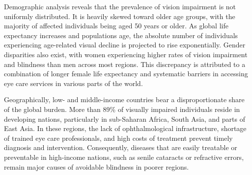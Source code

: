 Demographic analysis reveals that the prevalence of vision impairment is not uniformly distributed. It is heavily skewed toward older age groups, with the majority of affected individuals being aged 50 years or older. As global life expectancy increases and populations age, the absolute number of individuals experiencing age-related visual decline is projected to rise exponentially. Gender disparities also exist, with women experiencing higher rates of vision impairment and blindness than men across most regions. This discrepancy is attributed to a combination of longer female life expectancy and systematic barriers in accessing eye care services in various parts of the world.

Geographically, low- and middle-income countries bear a disproportionate share of the global burden. More than 89\% of visually impaired individuals reside in developing nations, particularly in sub-Saharan Africa, South Asia, and parts of East Asia. In these regions, the lack of ophthalmological infrastructure, shortage of trained eye care professionals, and high costs of treatment prevent timely diagnosis and intervention. Consequently, diseases that are easily treatable or preventable in high-income nations, such as senile cataracts or refractive errors, remain major causes of avoidable blindness in poorer regions.

